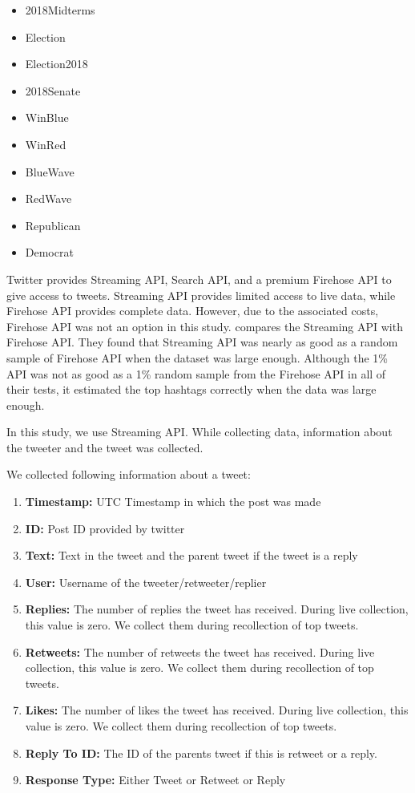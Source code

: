 \documentclass[letterpaper]{article}
\begin{document}
\begin{itemize}
    \item 2018Midterms
    \item Election
    \item Election2018
    \item 2018Senate
    \item WinBlue
    \item WinRed
    \item BlueWave
    \item RedWave
    \item Republican
    \item Democrat
\end{itemize}

Twitter provides Streaming API, Search API, and a premium Firehose API to give access to tweets. 
Streaming API provides limited access to live data, while Firehose API provides complete data. However, due to the 
associated costs, Firehose API was not an option in this study. \cite{morstatter2013sample} compares the 
Streaming API with Firehose API. They found that Streaming API was nearly as good as a random sample of Firehose API 
when the dataset was large enough. Although the 1\% API was not as good as a 1\% random sample from the Firehose API 
in all of their tests, it estimated the top hashtags correctly when the data was large enough. \par 

In this study, we use Streaming API. While collecting data, information about the tweeter and the tweet was collected. 

We collected following information about a tweet:
\begin{enumerate}[label=\textbf{\arabic*}]
    \item \textbf{Timestamp:} UTC Timestamp in which the post was made
    \item \textbf{ID:} Post ID provided by twitter
    \item \textbf{Text:} Text in the tweet and the parent tweet if the tweet is a reply
    \item \textbf{User:} Username of the tweeter/retweeter/replier
    \item \textbf{Replies:} The number of replies the tweet has received. During live collection, this value is zero. We collect them during recollection of top tweets.
    \item \textbf{Retweets:} The number of retweets the tweet has received. During live collection, this value is zero. We collect them during recollection of top tweets.
    \item \textbf{Likes:} The number of likes the tweet has received. During live collection, this value is zero. We collect them during recollection of top tweets.
    \item \textbf{Reply To ID:} The ID of the parents tweet if this is retweet or a reply.
    \item \textbf{Response Type:} Either Tweet or Retweet or Reply
\end{enumerate}
\bigskip
\end{document}
